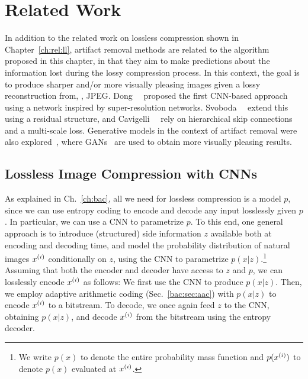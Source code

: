 \section{Related Work}

In addition to the related work on lossless compression shown in
Chapter~\ref{ch:rel:ll}, artifact removal methods are related to the algorithm
proposed in this chapter, in that they aim to make predictions about the
information lost during the lossy compression process. In this context, the
goal is to produce sharper and/or more visually pleasing images given a lossy
reconstruction from, \eg, JPEG. Dong~\etal~\cite{dong2015compression} proposed
the first CNN-based approach using a network inspired by super-resolution
networks.  Svoboda~\etal~\cite{svoboda2016compression} extend this using a residual
structure, and Cavigelli~\etal~\cite{cavigelli2017cas} rely on hierarchical skip connections
and a multi-scale loss.  Generative models in the context of artifact removal
were also explored~\cite{galteri2017deep}, where
GANs~\cite{goodfellow2014generative} are used to obtain more visually pleasing
results. 

\subsection{Lossless Image Compression with CNNs}
\label{rc:sec:losslesscompcnn}

As explained in Ch.~\ref{ch:bac}, all we need for lossless compression is a
model $p$, since we can use entropy coding to encode and decode any input
losslessly given $p$.  In particular, we can use a CNN to parametrize $p$. To
this end, one general approach is to introduce (structured) side information
$z$ available both at encoding and decoding time, and model the probability
distribution of natural images $x^{(i)}$ conditionally on $z$, using the CNN to
parametrize $p(x|z)$.\footnote{We write $p(x)$ to denote the entire
probability mass function and $p(x^{(i)})$ to denote $p(x)$ evaluated at
$x^{(i)}$.} Assuming that both the encoder and decoder have access to $z$ and
$p$, we can losslessly encode $x^{(i)}$ as follows: We first use the CNN to
produce $p(x|z)$. Then, we employ adaptive arithmetic coding (Sec.~\ref{bac:sec:aac})
with $p(x|z)$ to encode $x^{(i)}$ to a bitstream. To decode, we once
again feed $z$ to the CNN, obtaining $p(x|z)$, and decode $x^{(i)}$ from the
bitstream using the entropy decoder.

